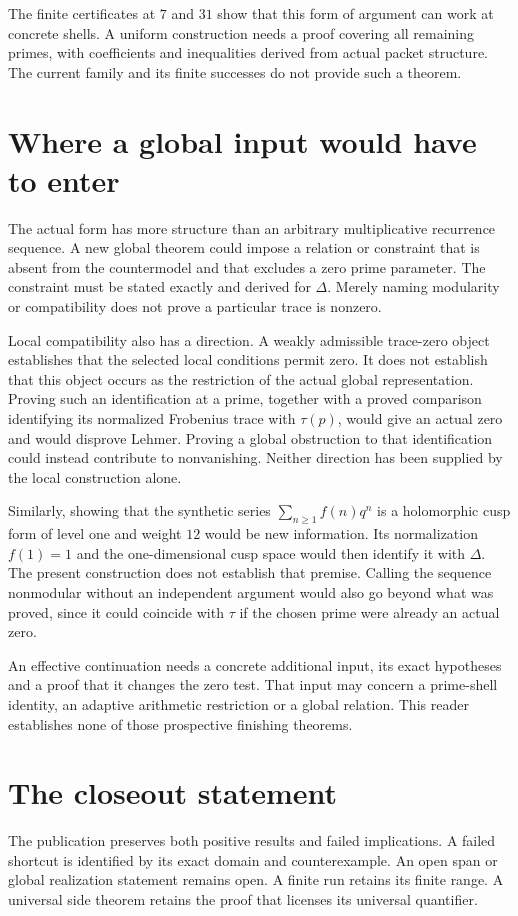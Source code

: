The finite certificates at $7$ and $31$ show that this form of argument can work at concrete shells. A uniform construction needs a proof covering all remaining primes, with coefficients and inequalities derived from actual packet structure. The current family and its finite successes do not provide such a theorem.

\section{Where a global input would have to enter}
The actual form has more structure than an arbitrary multiplicative recurrence sequence. A new global theorem could impose a relation or constraint that is absent from the countermodel and that excludes a zero prime parameter. The constraint must be stated exactly and derived for $\Delta$. Merely naming modularity or compatibility does not prove a particular trace is nonzero.

Local compatibility also has a direction. A weakly admissible trace-zero object establishes that the selected local conditions permit zero. It does not establish that this object occurs as the restriction of the actual global representation. Proving such an identification at a prime, together with a proved comparison identifying its normalized Frobenius trace with $\tau(p)$, would give an actual zero and would disprove Lehmer. Proving a global obstruction to that identification could instead contribute to nonvanishing. Neither direction has been supplied by the local construction alone.

Similarly, showing that the synthetic series $\sum_{n\ge1}f(n)q^n$ is a holomorphic cusp form of level one and weight $12$ would be new information. Its normalization $f(1)=1$ and the one-dimensional cusp space would then identify it with $\Delta$. The present construction does not establish that premise. Calling the sequence nonmodular without an independent argument would also go beyond what was proved, since it could coincide with $\tau$ if the chosen prime were already an actual zero.

An effective continuation needs a concrete additional input, its exact hypotheses and a proof that it changes the zero test. That input may concern a prime-shell identity, an adaptive arithmetic restriction or a global relation. This reader establishes none of those prospective finishing theorems.

\section{The closeout statement}
The publication preserves both positive results and failed implications. A failed shortcut is identified by its exact domain and counterexample. An open span or global realization statement remains open. A finite run retains its finite range. A universal side theorem retains the proof that licenses its universal quantifier.

